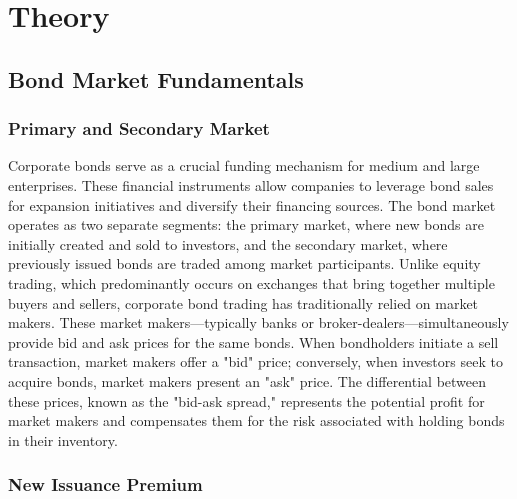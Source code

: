 \chapter{Theory}
\label{ch:theory}

\section{Bond Market Fundamentals}

\subsection{Primary and Secondary Market}

Corporate bonds serve as a crucial funding mechanism for medium and large enterprises. These financial instruments allow companies to leverage bond sales for expansion initiatives and diversify their financing sources. The bond market operates as two separate segments: the primary market, where new bonds are initially created and sold to investors, and the secondary market, where previously issued bonds are traded among market participants. Unlike equity trading, which predominantly occurs on exchanges that bring together multiple buyers and sellers, corporate bond trading has traditionally relied on market makers. These market makers—typically banks or broker-dealers—simultaneously provide bid and ask prices for the same bonds. When bondholders initiate a sell transaction, market makers offer a "bid" price; conversely, when investors seek to acquire bonds, market makers present an "ask" price. The differential between these prices, known as the "bid-ask spread," represents the potential profit for market makers and compensates them for the risk associated with holding bonds in their inventory.

\subsection{New Issuance Premium}

